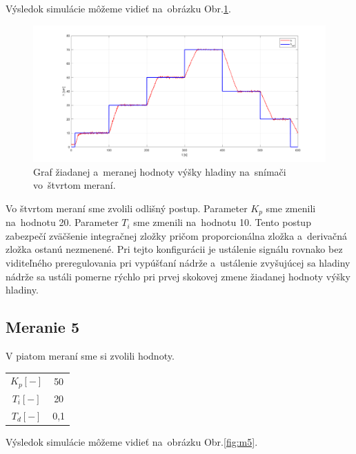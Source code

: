 \documentclass{article}
\begin{document}
Výsledok simulácie môžeme vidieť na~obrázku Obr.\ref{fig:m4}.

\begin{figure}[!htbp]
	\begin{center}
		\includegraphics[width=\textwidth]{./include/meranie4.png}
	\end{center}
	\caption{Graf žiadanej a~meranej hodnoty výšky hladiny na~snímači vo~štvrtom meraní.}
	\label{fig:m4}
\end{figure}

Vo štvrtom meraní sme zvolili odlišný postup. Parameter $K_p$ sme zmenili na~hodnotu 20. Parameter $T_i$
sme zmenili na~hodnotu 10. Tento postup zabezpečí zväčšenie integračnej zložky pričom proporcionálna
zložka a~derivačná zložka ostanú nezmenené. Pri tejto konfigurácii je ustálenie signálu rovnako
bez viditeľného preregulovania pri vypúšťaní nádrže a~ustálenie zvyšujúcej sa hladiny nádrže sa ustáli
pomerne rýchlo pri prvej skokovej zmene žiadanej hodnoty výšky hladiny.

\clearpage

\subsection{Meranie 5}
\label{sec:meranie5}

V piatom meraní sme si zvolili hodnoty. 

\begin{center}
\begin{tabular}{ |c|c| }
 \hline
 $K_p [-]$ & 50 \\
 $T_i [-]$ & 20 \\
 $T_d [-]$ & 0,1 \\
 \hline
\end{tabular}
\end{center}

Výsledok simulácie môžeme vidieť na~obrázku Obr.\ref{fig:m5}.
\end{document}
